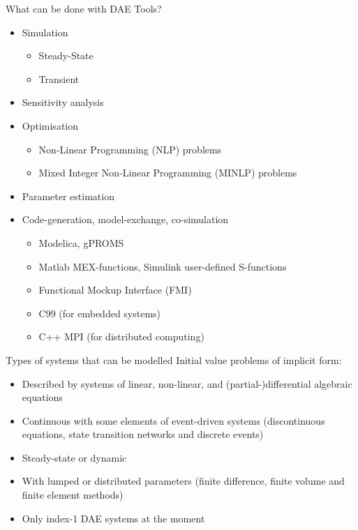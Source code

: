 \documentclass[compress,newPxFont,sthlmFooter]{beamer}
\begin{document}
\begin{frame}{What can be done with DAE Tools?} 
\begin{itemize}
  \item \alert{Simulation}
    \begin{itemize}
      \item Steady-State 
      \item Transient
    \end{itemize}
  \item \alert{Sensitivity analysis}
  \item \alert{Optimisation}
    \begin{itemize}
      \item Non-Linear Programming (NLP) problems
      \item Mixed Integer Non-Linear Programming (MINLP) problems
    \end{itemize}
  \item \alert{Parameter estimation}
  \item \alert{Code-generation}, \alert{model-exchange}, \alert{co-simulation} 
    \begin{itemize}
      \item Modelica, gPROMS
      \item Matlab MEX-functions, Simulink user-defined S-functions
      \item Functional Mockup Interface (FMI)
      \item C99 (for embedded systems)
      \item C++ MPI (for distributed computing) 
    \end{itemize}
\end{itemize}
\end{frame}

\begin{frame}{Types of systems that can be modelled}
  \alert{Initial value problems of implicit form}:
    \begin{itemize}
      \item Described by \alert{systems of linear, non-linear, and (partial-)differential} algebraic equations
      \item \alert{Continuous} with some elements of \alert{event-driven} systems 
            (discontinuous equations, state transition networks and discrete events) 
      \item \alert{Steady-state} or \alert{dynamic}
      \item With \alert{lumped} or \alert{distributed} parameters 
            (finite difference, finite volume and finite element methods)
      \item Only \alert{index-1} DAE systems at the moment
    \end{itemize}
\end{frame}
\end{document}
